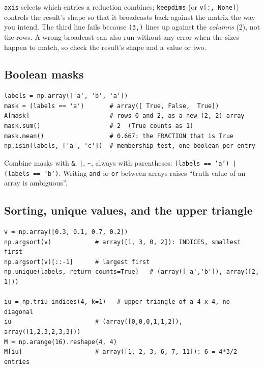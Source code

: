 \documentclass[11pt]{article}
\begin{document}
\texttt{axis} selects which entries a reduction combines; \texttt{keepdims} (or
\texttt{v[:, None]}) controls the result's shape so that it broadcasts back against the
matrix the way you intend. The third line fails because \texttt{(3,)} lines up against
the \emph{columns} (2), not the rows. A wrong broadcast can also run without any error
when the sizes happen to match, so check the result's shape and a value or two.

\subsection{Boolean masks}

\begin{codebox}
\begin{verbatim}
labels = np.array(['a', 'b', 'a'])
mask = (labels == 'a')       # array([ True, False,  True])
A[mask]                      # rows 0 and 2, as a new (2, 2) array
mask.sum()                   # 2  (True counts as 1)
mask.mean()                  # 0.667: the FRACTION that is True
np.isin(labels, ['a', 'c'])  # membership test, one boolean per entry
\end{verbatim}
\end{codebox}

Combine masks with \texttt{\&}, \texttt{|}, \texttt{\textasciitilde}, always with
parentheses: \texttt{(labels == 'a') | (labels == 'b')}. Writing \texttt{and} or
\texttt{or} between arrays raises ``truth value of an array is ambiguous''.

\subsection{Sorting, unique values, and the upper triangle}\label{sec:triu}

\begin{codebox}
\begin{verbatim}
v = np.array([0.3, 0.1, 0.7, 0.2])
np.argsort(v)            # array([1, 3, 0, 2]): INDICES, smallest first
np.argsort(v)[::-1]      # largest first
np.unique(labels, return_counts=True)   # (array(['a','b']), array([2, 1]))

iu = np.triu_indices(4, k=1)   # upper triangle of a 4 x 4, no diagonal
iu                       # (array([0,0,0,1,1,2]), array([1,2,3,2,3,3]))
M = np.arange(16).reshape(4, 4)
M[iu]                    # array([1, 2, 3, 6, 7, 11]): 6 = 4*3/2 entries
\end{verbatim}
\end{codebox}
\end{document}
